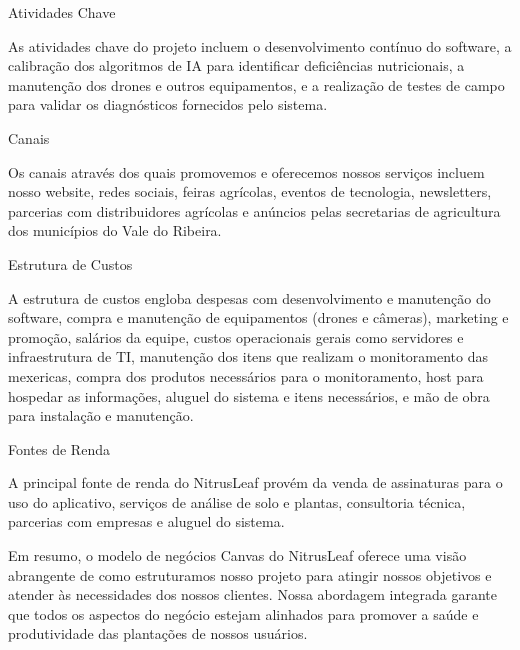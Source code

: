 Atividades Chave

As atividades chave do projeto incluem o desenvolvimento contínuo do software, a calibração dos algoritmos de IA para identificar deficiências nutricionais, a manutenção dos drones e outros equipamentos, e a realização de testes de campo para validar os diagnósticos fornecidos pelo sistema.

Canais

Os canais através dos quais promovemos e oferecemos nossos serviços incluem nosso website, redes sociais, feiras agrícolas, eventos de tecnologia, newsletters, parcerias com distribuidores agrícolas e anúncios pelas secretarias de agricultura dos municípios do Vale do Ribeira.

Estrutura de Custos

A estrutura de custos engloba despesas com desenvolvimento e manutenção do software, compra e manutenção de equipamentos (drones e câmeras), marketing e promoção, salários da equipe, custos operacionais gerais como servidores e infraestrutura de TI, manutenção dos itens que realizam o monitoramento das mexericas, compra dos produtos necessários para o monitoramento, host para hospedar as informações, aluguel do sistema e itens necessários, e mão de obra para instalação e manutenção.

Fontes de Renda

A principal fonte de renda do NitrusLeaf provém da venda de assinaturas para o uso do aplicativo, serviços de análise de solo e plantas, consultoria técnica, parcerias com empresas e aluguel do sistema.

Em resumo, o modelo de negócios Canvas do NitrusLeaf oferece uma visão abrangente de como estruturamos nosso projeto para atingir nossos objetivos e atender às necessidades dos nossos clientes. Nossa abordagem integrada garante que todos os aspectos do negócio estejam alinhados para promover a saúde e produtividade das plantações de nossos usuários.